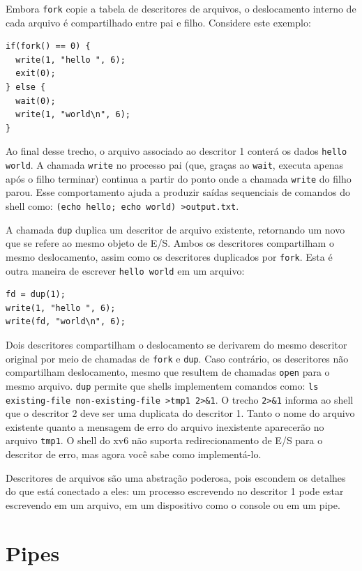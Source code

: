Embora
\lstinline{fork}
copie a tabela de descritores de arquivos, o deslocamento interno de cada arquivo é compartilhado
entre pai e filho.
Considere este exemplo:
\begin{lstlisting}[]
if(fork() == 0) {
  write(1, "hello ", 6);
  exit(0);
} else {
  wait(0);
  write(1, "world\n", 6);
}
\end{lstlisting}
Ao final desse trecho, o arquivo associado ao descritor 1
conterá os dados
\lstinline{hello}
\lstinline{world}.
A chamada
\lstinline{write}
no processo pai
(que, graças ao
\lstinline{wait},
executa apenas após o filho terminar)
continua a partir do ponto onde a chamada
\lstinline{write}
do filho parou.
Esse comportamento ajuda a produzir saídas sequenciais de comandos do shell como:
\lstinline{(echo hello; echo world) >output.txt}.

A chamada
\lstinline{dup}
duplica um descritor de arquivo existente,
retornando um novo que se refere ao mesmo objeto de E/S.
Ambos os descritores compartilham o mesmo deslocamento, assim como os descritores
duplicados por
\lstinline{fork}.
Esta é outra maneira de escrever
\lstinline{hello world}
em um arquivo:
\begin{lstlisting}[]
fd = dup(1);
write(1, "hello ", 6);
write(fd, "world\n", 6);
\end{lstlisting}

Dois descritores compartilham o deslocamento se derivarem do
mesmo descritor original por meio de chamadas de
\lstinline{fork}
e
\lstinline{dup}.
Caso contrário, os descritores não compartilham deslocamento, mesmo que resultem de
chamadas
\lstinline{open}
para o mesmo arquivo.
\lstinline{dup}
permite que shells implementem comandos como:
\lstinline{ls existing-file non-existing-file >tmp1 2>&1}.
O trecho
\lstinline{2>&1}
informa ao shell que o descritor 2 deve ser uma duplicata do descritor 1.
Tanto o nome do arquivo existente quanto a mensagem de erro do arquivo
inexistente aparecerão no arquivo
\lstinline{tmp1}.
O shell do xv6 não suporta redirecionamento de E/S para o descritor de erro,
mas agora você sabe como implementá-lo.

Descritores de arquivos são uma abstração poderosa,
pois escondem os detalhes do que está conectado a eles:
um processo escrevendo no descritor 1 pode estar escrevendo em um
arquivo, em um dispositivo como o console ou em um pipe.

\section{Pipes}

